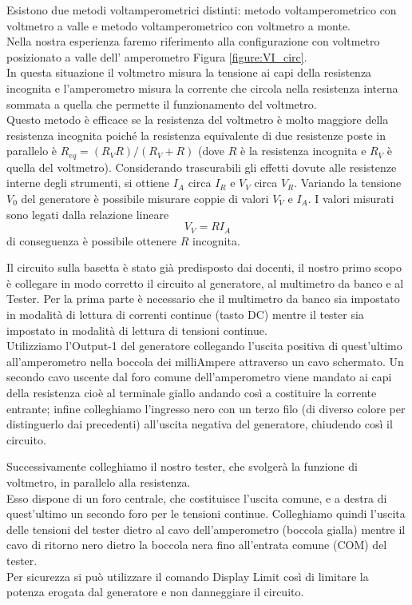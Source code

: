 \documentclass[italian, a4paper, 10pt, twocolumn]{../../style/lab_unige}
\newcommand{\reffig}[1]{Figura {\ref{#1}}}%
\begin{document}
    Esistono due metodi voltamperometrici distinti: metodo voltamperometrico con voltmetro a valle e metodo voltamperometrico con voltmetro a monte.\\
    Nella nostra esperienza faremo riferimento alla configurazione con voltmetro posizionato a valle dell’ amperometro \reffig{figure:VI_circ}.\\
    In questa situazione il voltmetro misura la tensione ai capi della resistenza incognita e l’amperometro misura la corrente che circola nella resistenza interna sommata a quella  che permette il funzionamento del voltmetro.\\
    Questo metodo è efficace se la resistenza del voltmetro è molto maggiore della resistenza incognita poiché la resistenza equivalente di due resistenze poste in parallelo è $R_{eq}=(R_V R)/(R_V+R)$ (dove $R$ è la resistenza incognita e $R_V$ è quella del voltmetro).
    Considerando trascurabili gli effetti dovute alle resistenze interne degli strumenti, si ottiene $I_A$ circa $I_R$ e $V_V$ circa $V_R$. 
    Variando la tensione $V_0$ del generatore è possibile misurare coppie di valori $V_V$ e $I_A$.  I valori misurati sono legati dalla relazione lineare \begin{equation}
        V_V =RI_A \label{equation:VI}
    \end{equation} di conseguenza è possibile ottenere $R$ incognita.

    Il circuito sulla basetta è stato già predisposto dai docenti, il nostro primo scopo è collegare in modo corretto il circuito al generatore, al  multimetro da banco e al Tester.
    Per la prima parte è necessario che il multimetro da banco sia impostato in modalità di lettura di correnti continue (tasto DC) mentre il tester sia impostato in modalità di lettura di tensioni continue.\\
    Utilizziamo l’Output-1 del generatore collegando l’uscita positiva di quest’ultimo  all’amperometro nella boccola dei milliAmpere attraverso un cavo schermato. Un secondo cavo uscente dal foro comune dell’amperometro viene mandato ai capi della resistenza cioè al terminale giallo andando così a costituire la corrente entrante; infine colleghiamo l’ingresso nero con un terzo filo (di diverso colore per distinguerlo dai precedenti) all’uscita negativa del generatore, chiudendo così il circuito.

    Successivamente colleghiamo il nostro tester, che svolgerà la funzione di voltmetro, in parallelo alla resistenza.\\
    Esso dispone di un foro centrale, che costituisce l’uscita comune, e a destra di quest’ultimo un secondo foro per le tensioni continue. Colleghiamo quindi l’uscita delle tensioni del tester dietro al cavo dell’amperometro (boccola gialla) mentre il cavo di ritorno nero dietro la boccola nera fino all'entrata comune (COM) del tester.\\
    Per sicurezza si può utilizzare il comando Display Limit così di limitare la potenza erogata dal generatore e non danneggiare il circuito.
\end{document}
